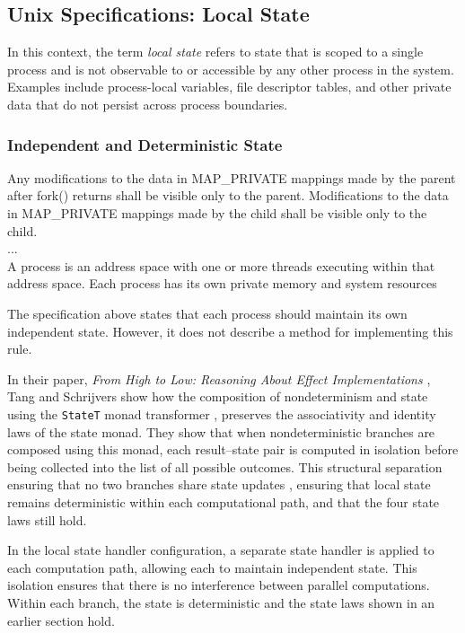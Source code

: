 \documentclass[logo,bsc,singlespacing,parskip]{infthesis}
\begin{document}
\subsection{Unix Specifications: Local State}

In this context, the term \textit{local state} refers to state that is scoped to a single process and is not observable to or accessible by any other process in the system. Examples include process-local variables, file descriptor tables, and other private data that do not persist across process boundaries. 


\subsubsection{Independent and Deterministic State} 

\begin{tcolorbox}[colback=gray!10, colframe=gray!60, sharp corners, boxrule=0.5pt, title={POSIX Base Specifications, Issue 7, p.899}]
    Any modifications to the data in
 MAP\_PRIVATE mappings made by the parent after fork() returns shall be visible only to
 the parent. Modifications to the data in MAP\_PRIVATE mappings made by the child shall
 be visible only to the child.
  \\ ... \\
A process is an address space with one or more threads executing within that address space. Each process has its own private memory and system resources
\end{tcolorbox}

The specification above states that each process should maintain its own independent state. However, it does not describe a method for implementing this rule.

In their paper, \textit{From High to Low: Reasoning About Effect Implementations} \cite{tang2025high}, Tang and Schrijvers show how the composition of nondeterminism and state using the \lstinline{StateT} monad transformer \cite{jones1993composing}, preserves the associativity and identity laws of the state monad. They show that when nondeterministic branches are composed using this monad, each result–state pair is computed in isolation before being collected into the list of all possible outcomes. This structural separation ensuring  that no two branches share state updates \cite{}, ensuring that local state remains deterministic within each computational path, and that the four state laws still hold.

In the local state handler configuration, a separate state handler is applied to each computation path, allowing each to maintain independent state. This isolation ensures that there is no interference between parallel computations. Within each branch, the state is deterministic and the state laws shown in an earlier section hold.
\end{document}
